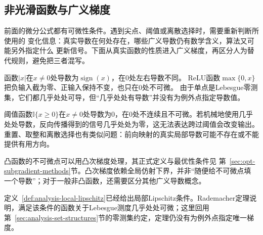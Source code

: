 \subsection{非光滑函数与广义梯度}
\label{sec:analysis-nonsmooth-surrogate-gradient}
前面的微分公式都有可微性条件。遇到尖点、阈值或离散选择时，需要重新判断所使用的
变化信息：真实导数在何处存在，哪些广义导数仍有数学含义，算法又可能另外指定什么
更新信号。下面从真实函数的性质进入广义梯度，再区分人为替代规则，避免把三者混写。

函数$|x|$在$x\neq0$处导数为$\operatorname{sign}(x)$，在$0$处左右导数不同。
ReLU函数$\max\{0,x\}$把负输入截为零、正输入保持不变，也只在$0$处不可微。
由于单点是Lebesgue零测集，它们都几乎处处可导，但“几乎处处有导数”并没有为例外点指定导数值。

阈值函数$\mathbb{I}\{x\geq0\}$在$x\neq0$处导数为$0$，在$0$处不连续且不可微。若机械地使用几乎处处导数，反向传播得到的信号几乎处处为零，这无法表达跨过阈值会改变输出。重置、取整和离散选择也有类似问题：前向映射的真实局部导数可能不存在或不能提供有用方向。

凸函数的不可微点可以用凸次梯度处理，其正式定义与最优性条件见
第~\ref{sec:opt-subgradient-methods}节。凸次梯度依赖全局仿射下界，并非“随便给不可微点填
一个导数”；对于一般非凸函数，还需要区分其他广义导数概念。

定义~\ref{def:analysis-local-lipschitz}已经给出局部Lipschitz条件。Rademacher定理说明，满足该条件的函数关于Lebesgue测度几乎处处可微；这里回用第~\ref{sec:analysis-set-structures}节的零测集约定，定理仍没有为例外点指定唯一梯度。

